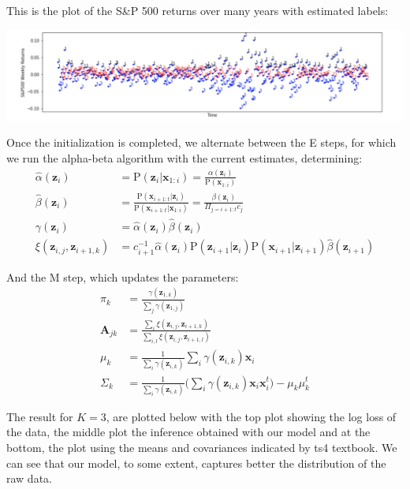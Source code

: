 \documentclass[12pt]{article}
\newcommand{\p}[1]{\mathrm{P}\left(#1 \right)}
\newcommand{\vect}[1]{\mathbf{#1}}
\newcommand{\matr}[1]{\bm{#1}}
\begin{document}
This is the plot of the S\&P 500 returns over many years with estimated labels:
\begin{center}
	\includegraphics[width=1\linewidth]{figures/problem-3-1.png} 
\end{center}

Once the initialization is completed, we alternate between the E steps, for which we run the alpha-beta algorithm with the current estimates, determining:
\begin{align*}
	\hat{\alpha}(\vect{z}_i)			&=	\p{\vect{z}_i | \vect{x}_{1:i}} 	=	\frac{\alpha(\vect{z}_i)} {\p{ \vect{x}_{1:i} }}	\\
	\hat{\beta}(\vect{z}_i)				&=	\frac{ \p{ \vect{x}_{i+1:t} | \vect{z}_i } }  {\p{ \vect{x}_{i+1:t} |  \vect{x}_{1:i}}}	= \frac{ \beta(\vect{z}_i) } {\Pi _{j=i+1:t} c_j} \\
	\gamma(\vect{z}_i)				&= 	\hat{\alpha}(\vect{z}_i) \hat{\beta}(\vect{z}_i)	\\
	\xi(\vect{z}_{i,j}, \vect{z}_{i+1,k})	&= 	c_{i+1}^{-1} \hat{\alpha}(\vect{z}_i) \p{\vect{z}_{i+1} | \vect{z}_i} \p{\vect{x}_{i+1} | \vect{z}_{i+1}} \hat{\beta}(\vect{z}_{i+1})	
\end{align*}

And the M step, which updates the parameters:
\begin{align*}
	\pi_k			&=	\frac{ \gamma(\vect{z}_{1,k}) } {\sum_j \gamma(\vect{z}_{1,j}) } \\
	\matr{A}_{jk}	&=	\frac{ \sum_i \xi(\vect{z}_{i,j} , \vect{z}_{i+1,k})}	{ \sum_{i,l} \xi(\vect{z}_{i,j} , \vect{z}_{i+1,l}) } \\
	\mu_k		&=	\frac{1} {\sum_i \gamma(\vect{z}_{i,k}) }  \sum_i \gamma(\vect{z}_{i,k}) \vect{x}_i \\
	\Sigma_k		&= 	\frac{1} {\sum_i \gamma(\vect{z}_{i,k}) }  \bigg(	\sum_i \gamma(\vect{z}_{i,k}) \vect{x}_i  \vect{x}_i^t	\bigg) - \mu_k \mu_k^t
\end{align*}

The result for $K=3$, are plotted below with the top plot showing the log loss of the data, the middle plot the inference obtained with our model and at the bottom, the plot using the means and covariances
indicated by ts4 textbook.  We can see that our model, to some extent, captures better the distribution of the raw data.
\end{document}
